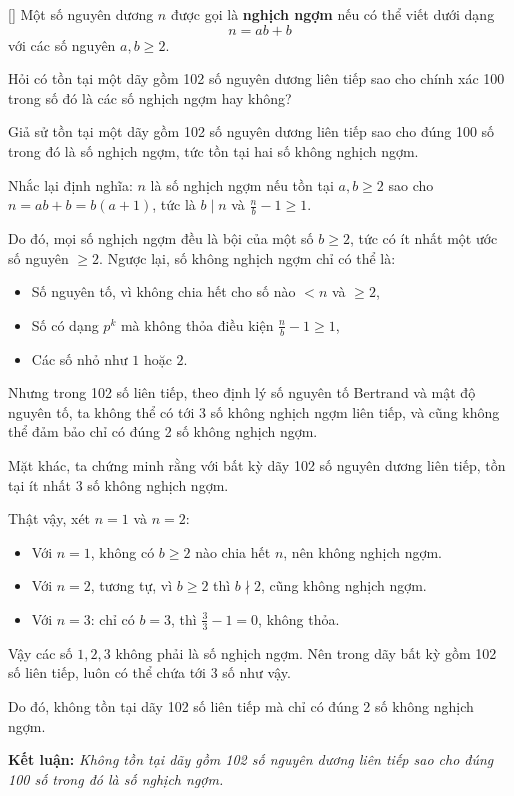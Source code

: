 \documentclass[../09-contruction-methods.tex]{subfiles}
\begin{document}
\begin{example*}\label{example:GER-2015-TST-P2}[\textbf{}]
    Một số nguyên dương \( n \) được gọi là \textbf{nghịch ngợm} nếu có thể viết dưới dạng
    \[
        n = ab + b
    \]
    với các số nguyên \( a, b \geq 2 \).

    Hỏi có tồn tại một dãy gồm 102 số nguyên dương liên tiếp sao cho chính xác 100 trong số đó là các số nghịch ngợm hay không?
\end{example*}

\begin{soln}\footnotemark
	Giả sử tồn tại một dãy gồm 102 số nguyên dương liên tiếp sao cho đúng 100 số trong đó là số nghịch ngợm, tức tồn tại hai số không nghịch ngợm.

	Nhắc lại định nghĩa: \( n \) là số nghịch ngợm nếu tồn tại \( a, b \ge 2 \) sao cho \( n = ab + b = b(a + 1) \), tức là \( b \mid n \) và \( \tfrac{n}{b} - 1 \ge 1 \).

	Do đó, mọi số nghịch ngợm đều là bội của một số \( b \ge 2 \), tức có ít nhất một ước số nguyên \( \ge 2 \).  
	Ngược lại, số không nghịch ngợm chỉ có thể là:
	\begin{itemize}[topsep=0pt, partopsep=0pt, itemsep=0pt]
		\item Số nguyên tố, vì không chia hết cho số nào \( < n \) và \( \ge 2 \),
		\item Số có dạng \( p^k \) mà không thỏa điều kiện \( \tfrac{n}{b} - 1 \ge 1 \),
		\item Các số nhỏ như \( 1 \) hoặc \( 2 \).
	\end{itemize}

	Nhưng trong 102 số liên tiếp, theo định lý số nguyên tố Bertrand và mật độ nguyên tố, ta không thể có tới 3 số không nghịch ngợm liên tiếp, và cũng không thể đảm bảo chỉ có đúng 2 số không nghịch ngợm.

	Mặt khác, ta chứng minh rằng với bất kỳ dãy 102 số nguyên dương liên tiếp, tồn tại ít nhất 3 số không nghịch ngợm.

	Thật vậy, xét \( n = 1 \) và \( n = 2 \):  
	\begin{itemize}[topsep=0pt, partopsep=0pt, itemsep=0pt]
		\item Với \( n = 1 \), không có \( b \ge 2 \) nào chia hết \( n \), nên không nghịch ngợm.  
		\item Với \( n = 2 \), tương tự, vì \( b \ge 2 \) thì \( b \nmid 2 \), cũng không nghịch ngợm.  
		\item Với \( n = 3 \): chỉ có \( b = 3 \), thì \( \tfrac{3}{3} - 1 = 0 \), không thỏa.
	\end{itemize}

	Vậy các số \( 1, 2, 3 \) không phải là số nghịch ngợm.  
	Nên trong dãy bất kỳ gồm 102 số liên tiếp, luôn có thể chứa tới 3 số như vậy.

	Do đó, không tồn tại dãy 102 số liên tiếp mà chỉ có đúng 2 số không nghịch ngợm.  
	
	\textbf{Kết luận:} \textit{Không tồn tại dãy gồm 102 số nguyên dương liên tiếp sao cho đúng 100 số trong đó là số nghịch ngợm.}
\end{soln}
\end{document}

